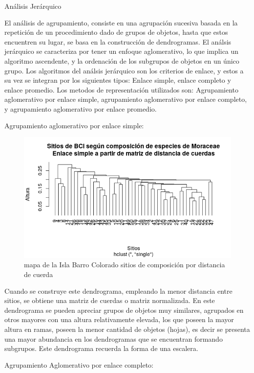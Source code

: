 \documentclass[11pt,]{article}
\begin{document}
Análisis Jerárquico

El análisis de agrupamiento, consiste en una agrupación sucesiva basada
en la repetición de un procedimiento dado de grupos de objetos, hasta
que estos encuentren su lugar, se basa en la construcción de
dendrogramas. El análsis jerárquico se caracteriza por tener un enfoque
aglomerativo, lo que implica un algoritmo ascendente, y la ordenación de
los subgrupos de objetos en un único grupo. Los algoritmos del análsis
jerárquico son los criterios de enlace, y estos a su vez se integran por
los siguientes tipos: Enlace simple, enlace completo y enlace promedio.
Los metodos de representación utilizados son: Agrupamiento aglomerativo
por enlace simple, agrupamiento aglomerativo por enlace completo, y
agrupamiento aglomerativo por enlace promedio.

Agrupamiento aglomerativo por enlace simple:

\begin{figure}
\centering
\includegraphics[width=1.00000\textwidth]{sitios_composicion_distancia_cuerdas.png}
\caption{mapa de la Isla Barro Colorado sitios de composición por
distancia de cuerda \label{fig:bci_map}}
\end{figure}

Cuando se construye este dendrograma, empleando la menor distancia entre
sitios, se obtiene una matriz de cuerdas o matriz normalizada. En este
dendrograma se pueden apreciar grupos de objetos muy similares,
agrupados en otros mayores con una altura relativamente elevada, los que
poseen la mayor altura en ramas, poseen la menor cantidad de objetos
(hojas), es decir se presenta una mayor abundancia en los dendrogramas
que se encuentran formando subgrupos. Este dendrograma recuerda la forma
de una escalera.

Agrupamiento Aglomerativo por enlace completo:
\end{document}
